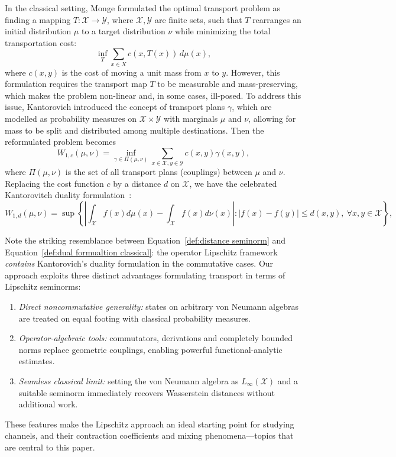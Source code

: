 \documentclass[11pt,reqno]{amsart}
\numberwithin{equation}{section}
\newcommand{\mc}{\mathcal}
\begin{document}
In the classical setting, Monge \cite{monge1781memoire} formulated the optimal transport problem as finding a mapping $ T : \mc X \rightarrow \mc Y$, where $\mc X,\mc Y$ are finite sets, such that $T$ rearranges an initial distribution $ \mu $ to a target distribution $ \nu $ while minimizing the total transportation cost:
$$
\inf_T \sum_{x \in X} c(x, T(x)) \, d\mu(x),
$$
where $ c(x, y) $ is the cost of moving a unit mass from $ x $ to $ y $. However, this formulation requires the transport map $ T $ to be measurable and mass-preserving, which makes the problem non-linear and, in some cases, ill-posed. To address this issue, Kantorovich \cite{kantorovich1942translocation} introduced the concept of transport plans $ \gamma $, which are modelled as probability measures on $ \mc X \times \mc Y $ with marginals $ \mu $ and $ \nu $, allowing for mass to be split and distributed among multiple destinations. Then the reformulated problem becomes
$$
W_{1,c}(\mu,\nu) = \inf_{\gamma \in \Pi(\mu, \nu)} \sum_{x \in \mc X, y\in \mc Y} c(x, y) \gamma(x, y),
$$
where $ \Pi(\mu, \nu) $ is the set of all transport plans (couplings) between $ \mu $ and $ \nu $. Replacing the cost function $c$ by a distance $d$ on $\mc X$, we have the celebrated Kantorovitch duality formulation~\cite{kantorovich1942translocation}:
\begin{equation}\label{def:dual formualtion classical}
    W_{1,d}(\mu,\nu)=\sup \left\{ \left|\int_{\mc X} f(x) d\mu(x) - \int_{\mc X} f(x)d\nu(x)\right|: |f(x)-f(y)| \leq d(x, y),\ \forall x, y \in \mc X\right\},
\end{equation}

Note the striking resemblance between Equation~\eqref{def:distance seminorm} and Equation~\eqref{def:dual formualtion classical}: the operator Lipschitz framework \emph{contains} Kantorovich’s duality formulation in the commutative cases. Our approach exploits three distinct advantages formulating transport in terms of Lipschitz seminorms:
\begin{enumerate}
\item \emph{Direct noncommutative generality:} states on arbitrary von Neumann algebras are treated on equal footing with classical probability measures.
\item \emph{Operator-algebraic tools:} commutators, derivations and completely bounded norms replace geometric couplings, enabling powerful functional-analytic estimates.
\item \emph{Seamless classical limit:} setting the von Neumann algebra as $L_{\infty}(\mc X)$ and a suitable seminorm immediately recovers Wasserstein distances without additional work.
\end{enumerate}
These features make the Lipschitz approach an ideal starting point for studying channels, and their contraction coefficients and mixing phenomena—topics that are central to this paper.
\end{document}

